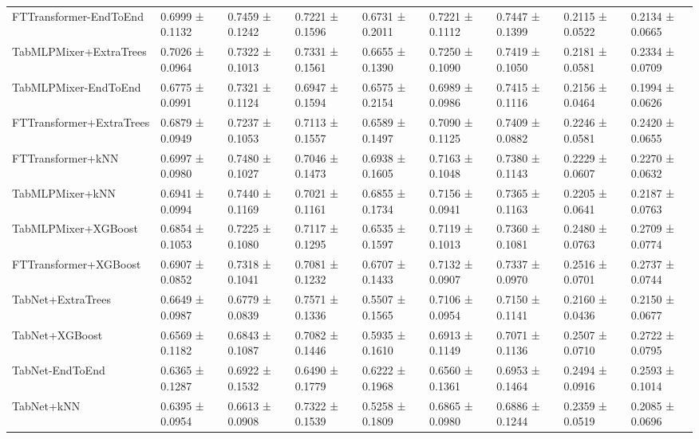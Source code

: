 \begin{table}
\begin{tabular}{lllllllll}
FTTransformer-EndToEnd & 0.6999 ± 0.1132 & 0.7459 ± 0.1242 & 0.7221 ± 0.1596 & 0.6731 ± 0.2011 & 0.7221 ± 0.1112 & 0.7447 ± 0.1399 & 0.2115 ± 0.0522 & 0.2134 ± 0.0665 \\
TabMLPMixer+ExtraTrees & 0.7026 ± 0.0964 & 0.7322 ± 0.1013 & 0.7331 ± 0.1561 & 0.6655 ± 0.1390 & 0.7250 ± 0.1090 & 0.7419 ± 0.1050 & 0.2181 ± 0.0581 & 0.2334 ± 0.0709 \\
TabMLPMixer-EndToEnd & 0.6775 ± 0.0991 & 0.7321 ± 0.1124 & 0.6947 ± 0.1594 & 0.6575 ± 0.2154 & 0.6989 ± 0.0986 & 0.7415 ± 0.1116 & 0.2156 ± 0.0464 & 0.1994 ± 0.0626 \\
FTTransformer+ExtraTrees & 0.6879 ± 0.0949 & 0.7237 ± 0.1053 & 0.7113 ± 0.1557 & 0.6589 ± 0.1497 & 0.7090 ± 0.1125 & 0.7409 ± 0.0882 & 0.2246 ± 0.0581 & 0.2420 ± 0.0655 \\
FTTransformer+kNN & 0.6997 ± 0.0980 & 0.7480 ± 0.1027 & 0.7046 ± 0.1473 & 0.6938 ± 0.1605 & 0.7163 ± 0.1048 & 0.7380 ± 0.1143 & 0.2229 ± 0.0607 & 0.2270 ± 0.0632 \\
TabMLPMixer+kNN & 0.6941 ± 0.0994 & 0.7440 ± 0.1169 & 0.7021 ± 0.1161 & 0.6855 ± 0.1734 & 0.7156 ± 0.0941 & 0.7365 ± 0.1163 & 0.2205 ± 0.0641 & 0.2187 ± 0.0763 \\
TabMLPMixer+XGBoost & 0.6854 ± 0.1053 & 0.7225 ± 0.1080 & 0.7117 ± 0.1295 & 0.6535 ± 0.1597 & 0.7119 ± 0.1013 & 0.7360 ± 0.1081 & 0.2480 ± 0.0763 & 0.2709 ± 0.0774 \\
FTTransformer+XGBoost & 0.6907 ± 0.0852 & 0.7318 ± 0.1041 & 0.7081 ± 0.1232 & 0.6707 ± 0.1433 & 0.7132 ± 0.0907 & 0.7337 ± 0.0970 & 0.2516 ± 0.0701 & 0.2737 ± 0.0744 \\
TabNet+ExtraTrees & 0.6649 ± 0.0987 & 0.6779 ± 0.0839 & 0.7571 ± 0.1336 & 0.5507 ± 0.1565 & 0.7106 ± 0.0954 & 0.7150 ± 0.1141 & 0.2160 ± 0.0436 & 0.2150 ± 0.0677 \\
TabNet+XGBoost & 0.6569 ± 0.1182 & 0.6843 ± 0.1087 & 0.7082 ± 0.1446 & 0.5935 ± 0.1610 & 0.6913 ± 0.1149 & 0.7071 ± 0.1136 & 0.2507 ± 0.0710 & 0.2722 ± 0.0795 \\
TabNet-EndToEnd & 0.6365 ± 0.1287 & 0.6922 ± 0.1532 & 0.6490 ± 0.1779 & 0.6222 ± 0.1968 & 0.6560 ± 0.1361 & 0.6953 ± 0.1464 & 0.2494 ± 0.0916 & 0.2593 ± 0.1014 \\
TabNet+kNN & 0.6395 ± 0.0954 & 0.6613 ± 0.0908 & 0.7322 ± 0.1539 & 0.5258 ± 0.1809 & 0.6865 ± 0.0980 & 0.6886 ± 0.1244 & 0.2359 ± 0.0519 & 0.2085 ± 0.0696 \\
\bottomrule
\end{tabular}
\end{table}


